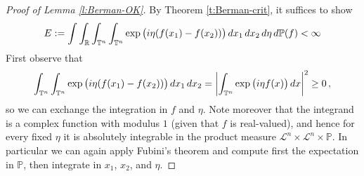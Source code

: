 \documentclass[11pt,reqno]{amsart}
\newcommand{\R}{\mathbb R}
\newcommand{\T}{{\mathbb T}}
\renewcommand{\exp}{{\rm exp}\,}
\theoremstyle{definition}
\numberwithin{equation}{section}
\begin{document}
\begin{proof}[Proof of Lemma \ref{l:Berman-OK}]
By Theorem \ref{t:Berman-crit}, it suffices to show
\begin{equation}\label{e:Berman-OK}
E:= \int \int_{\R}\int_{\T^n}\int_{\T^n} \exp \bigl(i\eta(f(x_1)-f(x_2))\bigr)\,dx_1\,dx_2\,d\eta\, d\mathbb P (f) <\infty
\end{equation}
First observe that 
\[
\int_{\T^n}\int_{\T^n} \exp \bigl(i\eta(f(x_1)-f(x_2))\bigr)\,dx_1\,dx_2=\left|\int_{\T^n} \exp\bigl(i\eta f(x)\bigr)\,dx\right|^2\ge0\, ,
\]
so we can exchange the integration in $f$ and $\eta$. Note moreover that the integrand is a complex function with modulus $1$ (given that $f$ is real-valued), and hence for every fixed $\eta$ it is absolutely integrable in the product measure $\mathcal{L}^n \times \mathcal{L}^n \times \mathbb P$. In particular we can again apply Fubini's theorem and compute first the expectation in $\mathbb P$, then integrate in $x_1$, $x_2$, and $\eta$.


\end{proof}
\end{document}
